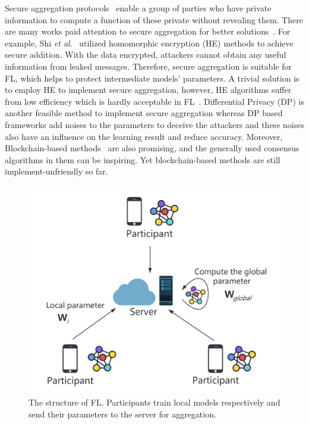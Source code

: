 Secure aggregation protocols~\cite{shi2011privacy} enable a group of parties who have private information to compute a function of these private without revealing them. There are many works paid attention to secure aggregation for better solutions~\cite{shi2011privacy,RobustAgg,Bonawitz19,Nike,PrivFL}. For example, Shi \emph{et al}.~\cite{shi2011privacy} utilized homomorphic encryption (HE) methods to achieve secure addition. With the data encrypted, attackers cannot obtain any useful information from leaked messages. Therefore, secure aggregation is suitable for FL, which helps to protect intermediate models' parameters. A trivial solution is to employ HE to implement secure aggregation, however, HE algorithms suffer from low efficiency which is hardly acceptable in FL~\cite{HESurvey}. Differential Privacy (DP) is another feasible method to implement secure aggregation whereas DP based frameworks add noises to the parameters to deceive the attackers and these noises also have an influence on the learning result and reduce accuracy. Moreover, Blockchain-based methods~\cite{DeepChain,Lu2020,On-Device} are also promising, and the generally used consensus algorithms in them can be inspiring. Yet blockchain-based methods are still implement-unfriendly so far.

\begin{figure}[!ht]
    \centering
    \includegraphics[width=\columnwidth]{img/fed.png}
    \caption{The structure of FL. Participants train local models respectively and send their parameters to the server for aggregation.}
    \label{fed}
\end{figure}

